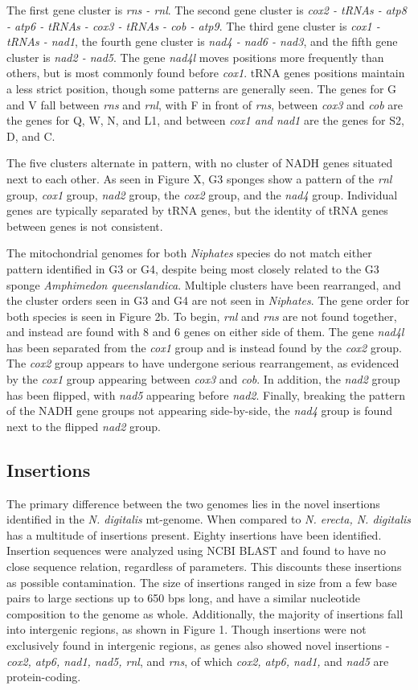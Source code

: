 \documentclass[../main.tex]{subfiles}
\begin{document}
The first gene cluster is \emph {rns - rnl}. The second gene cluster is \emph{cox2 - tRNAs - atp8 - atp6 - tRNAs - cox3 - tRNAs - cob - atp9}. The third gene cluster is \emph{cox1 - tRNAs - nad1}, the fourth gene cluster is \emph{nad4 - nad6 - nad3}, and the fifth gene cluster is \emph{nad2 - nad5}. The gene \emph{nad4l} moves positions more frequently than others, but is most commonly found before \emph{cox1}. tRNA genes positions maintain a less strict position, though some patterns are generally seen. The genes for G and V fall between \emph{rns} and \emph{rnl}, with F in front of \emph{rns}, between \emph{cox3} and \emph{cob} are the genes for Q, W, N, and L1, and between \emph{cox1 and nad1} are the genes for S2, D, and C.

The five clusters alternate in pattern, with no cluster of NADH genes situated next to each other. As seen in Figure X, G3 sponges show a pattern of the \emph{rnl} group, \emph{cox1} group, \emph{nad2} group, the \emph{cox2} group, and the \emph{nad4} group. Individual genes are typically separated by tRNA genes, but the identity of tRNA genes between genes is not consistent. 

The mitochondrial genomes for both \emph{Niphates} species do not match either pattern identified in G3 or G4, despite being most closely related to the G3 sponge \emph{Amphimedon queenslandica}. Multiple clusters have been rearranged, and the cluster orders seen in G3 and G4 are not seen in \emph{Niphates}. The gene order for both species is seen in Figure 2b. To begin, \emph{rnl} and \emph {rns} are not found together, and instead are found with 8 and 6 genes on either side of them. The gene \emph{nad4l} has been separated from the \emph{cox1} group and is instead found by the \emph{cox2} group. The \emph{cox2} group appears to have undergone serious rearrangement, as evidenced by the \emph{cox1} group appearing between \emph{cox3} and \emph{cob}. In addition, the \emph{nad2} group has been flipped, with \emph{nad5} appearing before \emph{nad2}. Finally, breaking the pattern of the NADH gene groups not appearing side-by-side, the \emph{nad4} group is found next to the flipped \emph{nad2} group. 

\subsection{Insertions}
The primary difference between the two genomes lies in the novel insertions identified in the \emph{N. digitalis} mt-genome. When compared to \emph{N. erecta, N. digitalis} has a multitude of insertions present. Eighty insertions have been identified. Insertion sequences were analyzed using NCBI BLAST and found to have no close sequence relation, regardless of parameters. This discounts these insertions as possible contamination. The size of insertions ranged in size from a few base pairs to large sections up to 650 bps long, and have a similar nucleotide composition to the genome as whole. Additionally, the majority of insertions fall into intergenic regions, as shown in Figure 1. Though insertions were not exclusively found in intergenic regions, as genes also showed novel insertions - \emph{cox2, atp6, nad1, nad5, rnl}, and \emph{rns}, of which \emph{cox2, atp6, nad1,} and \emph{nad5} are protein-coding.
\end{document}
